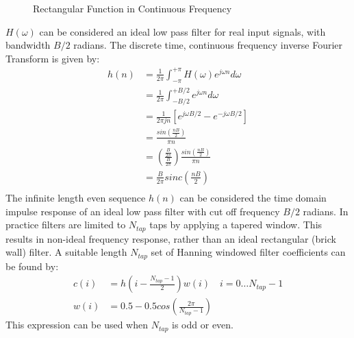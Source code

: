 \documentclass{article}
\begin{document}
\begin{figure}[h]
\caption{Rectangular Function in Continuous Frequency}
\vspace{5mm}
\label{fig:rect_freq}
\centering
{}
\end{figure}

$H(\omega)$ can be considered an ideal low pass filter for real input signals, with bandwidth $B/2$ radians. The discrete time, continuous frequency inverse Fourier Transform is given by:
\begin{equation} \label{eq:dtcf_1}
\begin{split}
h(n) &= \frac{1}{2 \pi} \int_{-\pi}^{+\pi} H(\omega )e^{j \omega n} d\omega \\
     &= \frac{1}{2 \pi} \int_{-B/2}^{+B/2} e^{j \omega n} d\omega \\
     &= \frac{1}{2 \pi jn} \left[ e^{j \omega B/2} - e^{-j \omega B/2} \right] \\
     &= \frac{sin \left( \frac{nB}{2} \right) }{\pi n} \\
     &= \left( \frac{\frac{B}{2 \pi}}{\frac{B}{2 \pi}} \right ) \frac{sin \left( \frac{nB}{2} \right) }{\pi n} \\
     &= \frac{B}{2 \pi} sinc \left( \frac{nB}{2} \right) \\
\end{split}
\end{equation}
The infinite length even sequence $h(n)$ can be considered the time domain impulse response of an ideal low pass filter with cut off frequency $B/2$ radians. In practice filters are limited to $N_{tap}$ taps by applying a tapered window.  This results in non-ideal frequency response, rather than an ideal rectangular (brick wall) filter. A suitable length $N_{tap}$ set of Hanning windowed filter coefficients can be found by:
\begin{equation}
\begin{split}
c(i) &= h \left( i-\frac{N_{tap}-1}{2} \right) w(i) \quad i=0 \ldots N_{tap}-1 \\
w(i) &= 0.5 - 0.5cos \left( \frac{2 \pi}{N_{tap}-1} \right)
\end{split}
\end{equation}
This expression can be used when $N_{tap}$ is odd or even.
\end{document}
